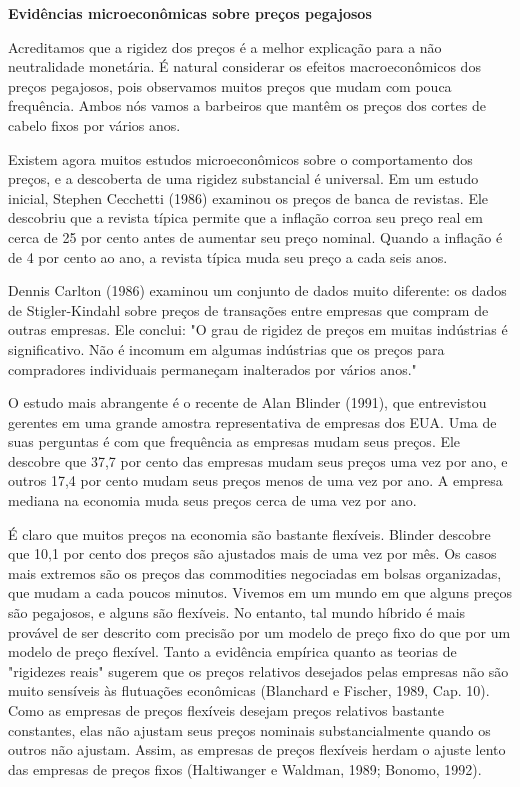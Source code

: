 \documentclass[a4paper,12pt]{article}[abntex2]
\begin{document}
\textbf{Evidências microeconômicas sobre preços pegajosos}

Acreditamos que a rigidez dos preços é a melhor explicação para a não neutralidade monetária. É natural considerar os efeitos macroeconômicos dos preços pegajosos, pois observamos muitos preços que mudam com pouca frequência. Ambos nós vamos a barbeiros que mantêm os preços dos cortes de cabelo fixos por vários anos.

Existem agora muitos estudos microeconômicos sobre o comportamento dos preços, e a descoberta de uma rigidez substancial é universal. Em um estudo inicial, Stephen Cecchetti (1986) examinou os preços de banca de revistas. Ele descobriu que a revista típica permite que a inflação corroa seu preço real em cerca de 25 por cento antes de aumentar seu preço nominal. Quando a inflação é de 4 por cento ao ano, a revista típica muda seu preço a cada seis anos.

Dennis Carlton (1986) examinou um conjunto de dados muito diferente: os dados de Stigler-Kindahl sobre preços de transações entre empresas que compram de outras empresas. Ele conclui: "O grau de rigidez de preços em muitas indústrias é significativo. Não é incomum em algumas indústrias que os preços para compradores individuais permaneçam inalterados por vários anos."

O estudo mais abrangente é o recente de Alan Blinder (1991), que entrevistou gerentes em uma grande amostra representativa de empresas dos EUA. Uma de suas perguntas é com que frequência as empresas mudam seus preços. Ele descobre que 37,7 por cento das empresas mudam seus preços uma vez por ano, e outros 17,4 por cento mudam seus preços menos de uma vez por ano. A empresa mediana na economia muda seus preços cerca de uma vez por ano.

É claro que muitos preços na economia são bastante flexíveis. Blinder descobre que 10,1 por cento dos preços são ajustados mais de uma vez por mês. Os casos mais extremos são os preços das commodities negociadas em bolsas organizadas, que mudam a cada poucos minutos. Vivemos em um mundo em que alguns preços são pegajosos, e alguns são flexíveis. No entanto, tal mundo híbrido é mais provável de ser descrito com precisão por um modelo de preço fixo do que por um modelo de preço flexível. Tanto a evidência empírica quanto as teorias de "rigidezes reais" sugerem que os preços relativos desejados pelas empresas não são muito sensíveis às flutuações econômicas (Blanchard e Fischer, 1989, Cap. 10). Como as empresas de preços flexíveis desejam preços relativos bastante constantes, elas não ajustam seus preços nominais substancialmente quando os outros não ajustam. Assim, as empresas de preços flexíveis herdam o ajuste lento das empresas de preços fixos (Haltiwanger e Waldman, 1989; Bonomo, 1992).
\end{document}
